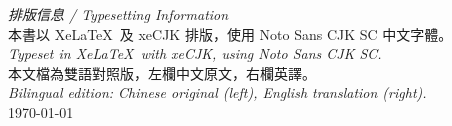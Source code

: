 \documentclass[11pt,a4paper]{article}
\providecommand{\XeLaTeX}{XeLaTeX}
\begin{document}
\vspace{0.5cm}

\begin{center}
\begin{minipage}{0.8\textwidth}
\centering
\textit{排版信息 / Typesetting Information}\\[0.3cm]
{\small 本書以 \XeLaTeX\ 及 xeCJK 排版，使用 Noto Sans CJK SC 中文字體。\\
\textit{Typeset in \XeLaTeX\ with xeCJK, using Noto Sans CJK SC.}\\[0.2cm]
本文檔為雙語對照版，左欄中文原文，右欄英譯。\\
\textit{Bilingual edition: Chinese original (left), English translation (right).}\\[0.2cm]
\today}
\end{minipage}
\end{center}
\end{document}
